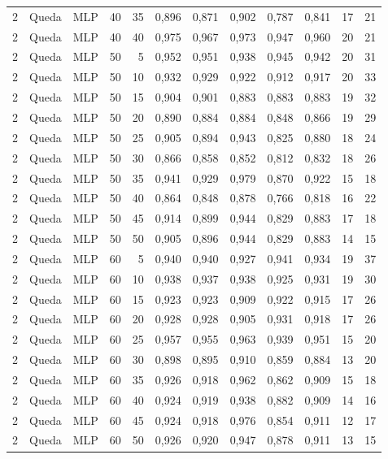\begin{longtable}{@{}rllrrrrrrrrr@{}}
2 & Queda & MLP & 40 & 35 & 0,896 & 0,871 & 0,902 & 0,787 & 0,841 & 17 & 21 \\
2 & Queda & MLP & 40 & 40 & 0,975 & 0,967 & 0,973 & 0,947 & 0,960 & 20 & 21 \\
2 & Queda & MLP & 50 & 5 & 0,952 & 0,951 & 0,938 & 0,945 & 0,942 & 20 & 31 \\
2 & Queda & MLP & 50 & 10 & 0,932 & 0,929 & 0,922 & 0,912 & 0,917 & 20 & 33 \\
2 & Queda & MLP & 50 & 15 & 0,904 & 0,901 & 0,883 & 0,883 & 0,883 & 19 & 32 \\
2 & Queda & MLP & 50 & 20 & 0,890 & 0,884 & 0,884 & 0,848 & 0,866 & 19 & 29 \\
2 & Queda & MLP & 50 & 25 & 0,905 & 0,894 & 0,943 & 0,825 & 0,880 & 18 & 24 \\
2 & Queda & MLP & 50 & 30 & 0,866 & 0,858 & 0,852 & 0,812 & 0,832 & 18 & 26 \\
2 & Queda & MLP & 50 & 35 & 0,941 & 0,929 & 0,979 & 0,870 & 0,922 & 15 & 18 \\
2 & Queda & MLP & 50 & 40 & 0,864 & 0,848 & 0,878 & 0,766 & 0,818 & 16 & 22 \\
2 & Queda & MLP & 50 & 45 & 0,914 & 0,899 & 0,944 & 0,829 & 0,883 & 17 & 18 \\
2 & Queda & MLP & 50 & 50 & 0,905 & 0,896 & 0,944 & 0,829 & 0,883 & 14 & 15 \\
2 & Queda & MLP & 60 & 5 & 0,940 & 0,940 & 0,927 & 0,941 & 0,934 & 19 & 37 \\
2 & Queda & MLP & 60 & 10 & 0,938 & 0,937 & 0,938 & 0,925 & 0,931 & 19 & 30 \\
2 & Queda & MLP & 60 & 15 & 0,923 & 0,923 & 0,909 & 0,922 & 0,915 & 17 & 26 \\
2 & Queda & MLP & 60 & 20 & 0,928 & 0,928 & 0,905 & 0,931 & 0,918 & 17 & 26 \\
2 & Queda & MLP & 60 & 25 & 0,957 & 0,955 & 0,963 & 0,939 & 0,951 & 15 & 20 \\
2 & Queda & MLP & 60 & 30 & 0,898 & 0,895 & 0,910 & 0,859 & 0,884 & 13 & 20 \\
2 & Queda & MLP & 60 & 35 & 0,926 & 0,918 & 0,962 & 0,862 & 0,909 & 15 & 18 \\
2 & Queda & MLP & 60 & 40 & 0,924 & 0,919 & 0,938 & 0,882 & 0,909 & 14 & 16 \\
2 & Queda & MLP & 60 & 45 & 0,924 & 0,918 & 0,976 & 0,854 & 0,911 & 12 & 17 \\
2 & Queda & MLP & 60 & 50 & 0,926 & 0,920 & 0,947 & 0,878 & 0,911 & 13 & 15 \\

\end{longtable}
